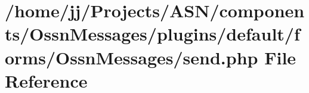 \hypertarget{_ossn_messages_2plugins_2default_2forms_2_ossn_messages_2send_8php}{}\section{/home/jj/\+Projects/\+A\+S\+N/components/\+Ossn\+Messages/plugins/default/forms/\+Ossn\+Messages/send.php File Reference}
\label{_ossn_messages_2plugins_2default_2forms_2_ossn_messages_2send_8php}
